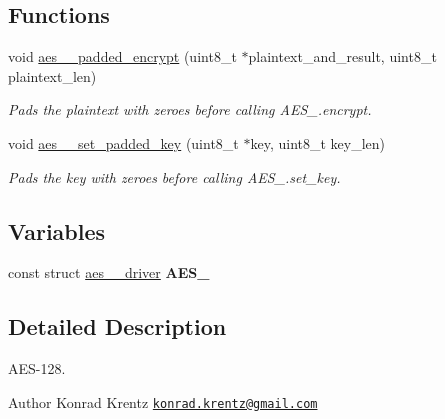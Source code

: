 \subsection*{Functions}
\begin{DoxyCompactItemize}
\item 
\hypertarget{aes-128_8h_aaf06f325766216e2c24ea4ce2d69bc38}{}void \hyperlink{aes-128_8h_aaf06f325766216e2c24ea4ce2d69bc38}{aes\+\_\+\_\+padded\+\_\+encrypt} (uint8\+\_\+t $\ast$plaintext\+\_\+and\+\_\+result, uint8\+\_\+t plaintext\+\_\+len)\label{aes-128_8h_aaf06f325766216e2c24ea4ce2d69bc38}

\begin{DoxyCompactList}\small\item\em Pads the plaintext with zeroes before calling A\+E\+S\+\_.\+encrypt. \end{DoxyCompactList}\item 
\hypertarget{aes-128_8h_af3d3a1d98476d18eb897330340517233}{}void \hyperlink{aes-128_8h_af3d3a1d98476d18eb897330340517233}{aes\+\_\+\_\+set\+\_\+padded\+\_\+key} (uint8\+\_\+t $\ast$key, uint8\+\_\+t key\+\_\+len)\label{aes-128_8h_af3d3a1d98476d18eb897330340517233}

\begin{DoxyCompactList}\small\item\em Pads the key with zeroes before calling A\+E\+S\+\_.\+set\+\_\+key. \end{DoxyCompactList}\end{DoxyCompactItemize}
\subsection*{Variables}
\begin{DoxyCompactItemize}
\item 
\hypertarget{aes-128_8h_ae2362227d4da790ed743d0bab74379bd}{}const struct \hyperlink{structaes__128__driver}{aes\+\_\+\_\+driver} {\bfseries A\+E\+S\+\_}\label{aes-128_8h_ae2362227d4da790ed743d0bab74379bd}

\end{DoxyCompactItemize}


\subsection{Detailed Description}
A\+E\+S-\/128. \begin{DoxyAuthor}{Author}
Konrad Krentz \href{mailto:konrad.krentz@gmail.com}{\tt konrad.\+krentz@gmail.\+com} 
\end{DoxyAuthor}

